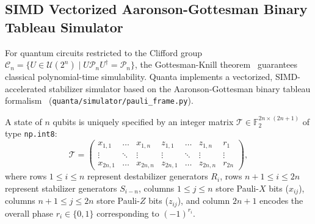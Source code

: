 \documentclass[aps,prx,twocolumn,superscriptaddress,nofootinbib]{revtex4-2}
\begin{document}
\subsection{SIMD Vectorized Aaronson-Gottesman Binary Tableau Simulator}
\label{subsec:pauli_frame}

For quantum circuits restricted to the Clifford group $\mathcal{C}_n = \{ U \in \mathcal{U}(2^n) \mid U \mathcal{P}_n U^\dagger = \mathcal{P}_n \}$, the Gottesman-Knill theorem~\cite{gottesman1997stabilizer} guarantees classical polynomial-time simulability. Quanta implements a vectorized, SIMD-accelerated stabilizer simulator based on the Aaronson-Gottesman binary tableau formalism~\cite{aaronson2004improved} (\texttt{quanta/simulator/pauli_frame.py}).

A state of $n$ qubits is uniquely specified by an integer matrix $\mathcal{T} \in \mathbb{F}_2^{2n \times (2n+1)}$ of type \texttt{np.int8}:
\begin{equation}
    \mathcal{T} = \begin{pmatrix}
        x_{1,1} & \dots & x_{1,n} & z_{1,1} & \dots & z_{1,n} & r_1 \\
        \vdots & \ddots & \vdots & \vdots & \ddots & \vdots & \vdots \\
        x_{2n,1} & \dots & x_{2n,n} & z_{2n,1} & \dots & z_{2n,n} & r_{2n}
    \end{pmatrix},
\end{equation}
where rows $1 \le i \le n$ represent destabilizer generators $R_i$, rows $n+1 \le i \le 2n$ represent stabilizer generators $S_{i-n}$, columns $1 \le j \le n$ store Pauli-$X$ bits ($x_{ij}$), columns $n+1 \le j \le 2n$ store Pauli-$Z$ bits ($z_{ij}$), and column $2n+1$ encodes the overall phase $r_i \in \{0, 1\}$ corresponding to $(-1)^{r_i}$.
\end{document}
